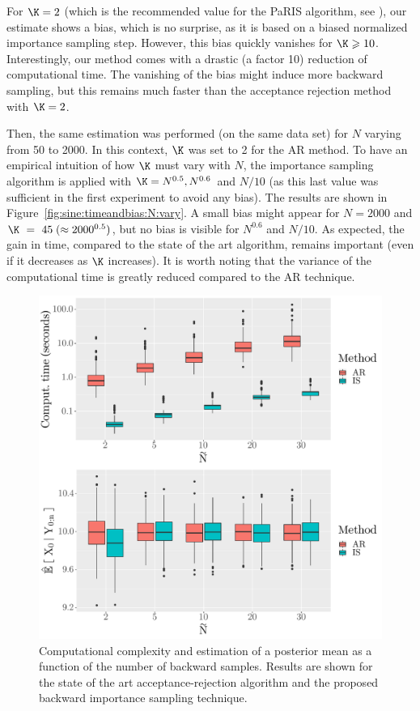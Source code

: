 \documentclass{article}
\newcommand{\N}{N}
\newcommand{\eqsp}{\;}
\begin{document}
For $\K = 2$ (which is the recommended value for the PaRIS algorithm, see \cite{olsson2017efficient}), our estimate shows a bias, which is no surprise, as it is based on a biased normalized importance sampling step. However, this bias quickly vanishes for $\K \geqslant 10$. 
Interestingly, our method comes with a drastic (a factor 10) reduction of computational time. 
The vanishing of the bias might induce more backward sampling, but this remains much faster than the acceptance rejection method with $\K = 2$.

Then, the same estimation was performed (on the same data set) for $\N$ varying from 50 to 2000.
In this context, $\K$ was set to 2 for the AR method. 
To have an empirical intuition of how $\K$ must vary with $\N$, the importance sampling algorithm is applied with $\K = \N^{0.5}, \N^{0.6}$ and $N / 10$ (as this last value was sufficient in the first experiment to avoid any bias). The results are shown in Figure~\ref{fig:sine:timeandbias:N:vary}. A  small bias might appear for $\N = 2000$ and $\K~=~45\eqsp(\approx 2000^{0.5})$, but no bias is visible for $\N^{0.6}$ and $\N /10$. 
As expected, the gain in time, compared to the state of the art algorithm, remains important (even if it decreases as $\K$ increases). 
It is worth noting that the variance of the computational time is greatly reduced compared to the AR technique.%

\begin{figure}[h]
\begin{center}
\includegraphics[scale = .4]{comparing_IS_AR_Ntilde_vary.pdf}
\end{center}
\caption{Computational complexity and estimation of a posterior mean as a function of the number of backward samples. Results are shown for the state of the art acceptance-rejection algorithm and the proposed backward importance sampling technique.}
\label{fig:sine:timeandbias}
\end{figure}
\end{document}
